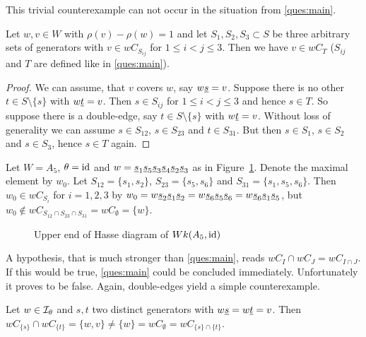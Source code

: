 This trivial counterexample can not occur in the situation from \ref{ques:main}.

\begin{prop}
	Let $w,v \in W$ with $\rho(v) - \rho(w) = 1$ and let $S_1,S_2,S_3 \subset S$ be three arbitrary sets of generators with $v \in w C_{S_{ij}}$ for $1 \leq i < j \leq 3$. Then we have $v \in wC_T$ ($S_{ij}$ and $T$ are defined like in \ref{ques:main}).

	\begin{proof}
		We can assume, that $v$ covers $w$, say $w \underline{s} = v$. Suppose there is no other $t \in S \setminus \{s\}$ with $w \underline{t} = v$. Then $s \in S_{ij}$ for $1 \leq i < j \leq 3$ and hence $s \in T$. So suppose there is a double-edge, say $t \in S \setminus \{s\}$ with $w \underline{t} = v$. Without loss of generality we can assume $s \in S_{12}$, $s \in S_{23}$ and $t \in S_{31}$. But then $s \in S_1$, $s \in S_2$ and $s \in S_3$, hence $s \in T$ again.
	\end{proof}
\end{prop}

\begin{exam}
	Let $W = A_5$, $\theta = \operatorname{id}$ and $w = \underline{s}_1 \underline{s}_5 \underline{s}_3 \underline{s}_4 \underline{s}_2 \underline{s}_3$ as in Figure~\ref{fig:main-thesis-weakend-hypothesis-counterexample}. Denote the maximal element by $w_0$. Let $S_{12} = \{s_1,s_2\}$, $S_{23} = \{s_5,s_6\}$ and $S_{31} = \{s_1,s_5,s_6\}$. Then $w_0 \in wC_{S_i}$ for $i=1,2,3$ by $w_0 = w \underline{s}_2 \underline{s}_1 \underline{s}_2 = w \underline{s}_6 \underline{s}_5 \underline{s}_6 = w \underline{s}_6 \underline{s}_1 \underline{s}_5$, but $w_0 \notin wC_{S_{12} \cap S_{23} \cap S_{31}} = wC_{\emptyset} = \{w\}$.

	\begin{figure}[ht]
		\centering
		
		\caption{Upper end of Hasse diagram of $Wk(A_5,\operatorname{id})$}
		\label{fig:main-thesis-weakend-hypothesis-counterexample}
	\end{figure}
\end{exam}

A hypothesis, that is much stronger than \ref{ques:main}, reads $wC_I \cap wC_J = wC_{I \cap J}$. If this would be true, \ref{ques:main} could be concluded immediately. Unfortunately it proves to be false. Again, double-edges yield a simple counterexample.

\begin{exam}
	Let $w \in \mathcal{I}_{\theta}$ and $s,t$ two distinct generators with $w \underline{s} = w \underline{t} = v$. Then $wC_{\{s\}} \cap wC_{\{t\}} = \{w,v\} \neq \{w\} = wC_{\emptyset} = wC_{\{s\} \cap \{t\}}$.
\end{exam}